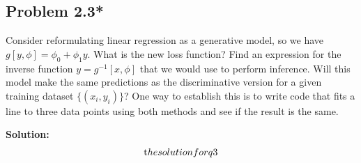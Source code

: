 \documentclass{article}
\begin{document}
    \subsection*{Problem 2.3*}
    Consider reformulating linear regression as a generative model, so we have $g[y, \phi] = \phi_0 + \phi_1 y$. What is the new loss function? Find an expression for the inverse function $y = g^{-1}[x, \phi]$ that we would use to perform inference. Will this model make the same predictions as the discriminative version for a given training dataset $\{(x_i, y_i)\}$? One way to establish this is to write code that fits a line to three data points using both methods and see if the result is the same.

        \vspace{1cm}
        \textbf{Solution:}
        \begin{align*}
            \text the solution for q3
        \end{align*}
\end{document}
